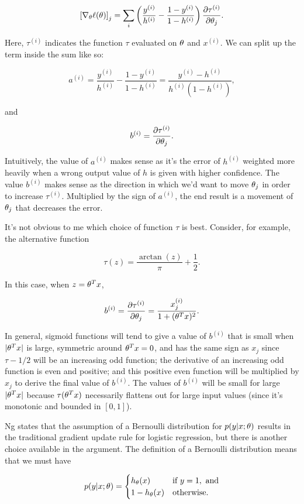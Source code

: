\documentclass[]{article}
\begin{document}
\newcommand{\toi}{^{(i)}}
\newcommand{\toj}{^{(j)}}

\[\left[\nabla_\th\ell(\th)\right]_j
= \sum_i\left(\frac{y\toi}{h\toi} - \frac{1-y\toi}{1-h\toi}\right)
\frac{\partial\tau\toi}{\partial\th_j}.\]

Here, \(\tau\toi\) indicates the function \(\tau\) evaluated on \(\theta\)
and \(x\toi\). We can split up the term inside the sum like so:

\[a\toi = 
\frac{y\toi}{h\toi} - \frac{1-y\toi}{1-h\toi}
= \frac{y\toi - h\toi}{h\toi(1-h\toi)},\]

and

\[b\toi = 
\frac{\partial\tau\toi}{\partial\th_j}.\]

Intuitively, the value of \(a\toi\) makes sense as it's the error of
\(h\toi\) weighted more heavily when a wrong output value of \(h\) is
given with higher confidence. The value \(b\toi\) makes sense as the
direction in which we'd want to move \(\theta_j\) in order to increase
\(\tau\toi\). Multiplied by the sign of \(a\toi\), the end result is a
movement of \(\theta_j\) that decreases the error.

It's not obvious to me which choice of function \(\tau\) is best.
Consider, for example, the alternative function

\[\tau(z) = \frac{\arctan(z)}{\pi} + \frac{1}{2}.\]

In this case, when \(z=\theta^Tx\),

\[b\toi
= \frac{\partial\tau\toi}{\partial\th_j} = \frac{x_j\toi}{1+(\th^Tx)^2}.\]

In general, sigmoid functions will tend to give a value of \(b\toi\)
that is small when \(|\theta^Tx|\) is large, symmetric around \(\theta^Tx=0\),
and has the same sign as \(x_j\) since \(\tau - 1/2\) will be an
increasing odd function; the derivative of an increasing odd function is
even and positive; and this positive even function will be multiplied by
\(x_j\) to derive the final value of \(b\toi.\) The values of \(b\toi\)
will be small for large \(|\theta^Tx|\) because \(\tau(\theta^Tx)\)
necessarily flattens out for large input values (since it's monotonic
and bounded in \([0,1]\)).

Ng states that the assumption of a Bernoulli distribution for
\(p(y|x;\theta)\) results in the traditional gradient update rule for
logistic regression, but there is another choice available in the
argument. The definition of a Bernoulli distribution means that we must
have

\[p(y|x;\theta) = \begin{cases}
h_\theta(x) & \text{if } y = 1, \text{ and} \\
1 - h_\theta(x) & \text{otherwise}.
\end{cases}\]
\end{document}
